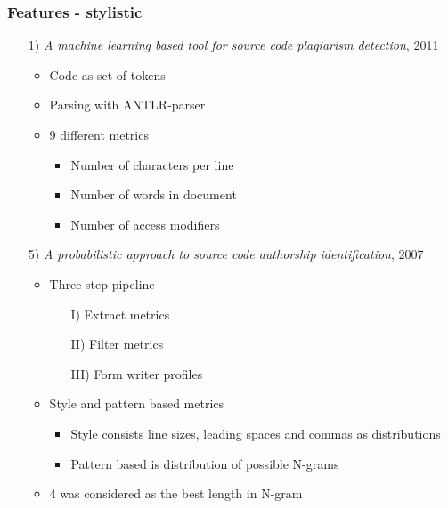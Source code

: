 \documentclass[t,12pt,pdftex]{beamer}
\begin{document}
\begin{frame}
	\frametitle{Features - stylistic}
	\begin{itemize}
		\item[1)] \textit{A machine learning based tool
for source code plagiarism detection}, 2011
		\begin{itemize}
			\item Code as set of tokens
			\item Parsing with ANTLR-parser
			\item 9 different metrics
			\begin{itemize}
				\item Number of characters per line
				\item Number of words in document
				\item Number of access modifiers	
			\end{itemize}
		\end{itemize}
	\end{itemize}
\end{frame}

\begin{frame}
	\vspace{0.5in}
	\begin{itemize}
		\item[5)] \textit{A probabilistic approach to source code authorship identification}, 2007
		\begin{itemize}
			\item Three step pipeline
			\begin{itemize}
				\item[I)] Extract metrics
				\item[II)] Filter metrics
				\item[III)] Form writer profiles
			\end{itemize}
			\item Style and pattern based metrics
			\begin{itemize}
				\item Style consists line sizes, leading spaces and commas as distributions
				\item Pattern based is distribution of possible N-grams
			\end{itemize}
			\item 4 was considered as the best length in N-gram
		\end{itemize}
	\end{itemize}
\end{frame}
\end{document}
